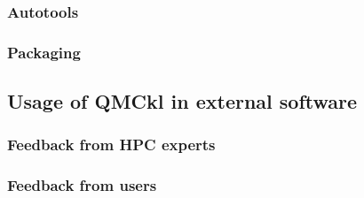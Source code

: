 \subsubsection{Autotools}

\subsubsection{Packaging}

\subsection{Usage of QMCkl in external software}

\subsubsection{Feedback from HPC experts}

\subsubsection{Feedback from users}

